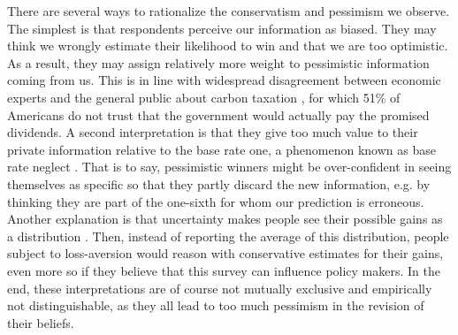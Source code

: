 \documentclass[12pt]{article} %
\begin{document}
There are several ways to rationalize the conservatism and pessimism we observe. The simplest is that respondents perceive our information as biased. They may think we wrongly estimate their likelihood to win and that we are too optimistic. As a result, they may assign relatively more weight to pessimistic information coming from us. This is in line with widespread disagreement between economic experts and the general public about carbon taxation \citep{sapienza_zingales_2013}, for which 51\% of Americans do not trust that the government would actually pay the promised dividends. A second interpretation is that they give too much value to their private information relative to the base rate one, a phenomenon known as base rate neglect \citep{grether_bayes_1980}. That is to say, pessimistic winners might be over-confident in seeing themselves as specific so that they partly discard the new information, e.g. by thinking they are part of the one-sixth for whom our prediction is erroneous. Another explanation is that uncertainty makes people see their possible gains as a distribution \citep[see][]{stiglitz_addressing_2019}. Then, instead of reporting the average of this distribution, people subject to loss-aversion would reason with conservative estimates for their gains, even more so if they believe that this survey can influence policy makers. In the end, these interpretations are of course not mutually exclusive and empirically not distinguishable, as they all lead to too much pessimism in the revision of their beliefs.
\end{document}
